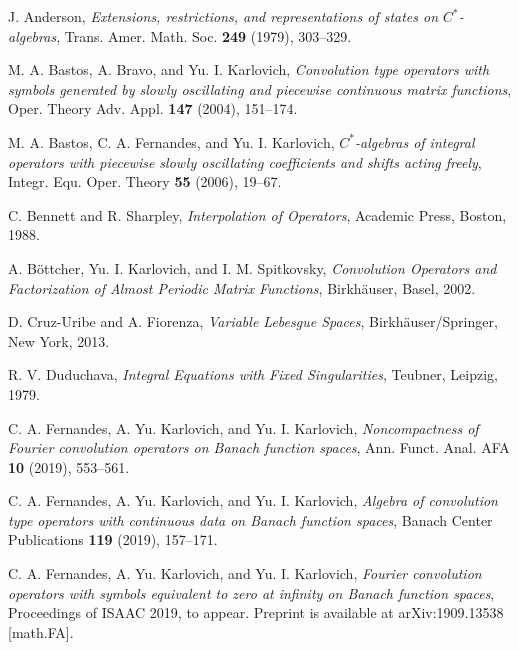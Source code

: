 \documentclass{birkjour}
\numberwithin{equation}{section}
\begin{document}
\begin{thebibliography}{XX}
J. Anderson,
\textit{Extensions, restrictions, and representations of states on
$C^*$-algebras},
Trans. Amer. Math. Soc. \textbf{249} (1979), 303--329.

M. A. Bastos, A. Bravo, and Yu. I. Karlovich,
\textit{Convolution type operators with symbols generated by slowly
oscillating and piecewise continuous matrix functions},
Oper. Theory Adv. Appl. \textbf{147} (2004), 151--174.

M. A. Bastos, C. A. Fernandes, and Yu. I. Karlovich,
\textit{$C^*$-algebras of integral operators with piecewise slowly
oscillating coefficients and shifts acting freely},
Integr. Equ. Oper. Theory \textbf{55} (2006), 19--67.

C. Bennett and R. Sharpley,
\textit{Interpolation of Operators},
Academic Press, Boston, 1988.

A. B\"ottcher, Yu. I. Karlovich, and I. M. Spitkovsky,
\textit{Convolution Operators and Factorization of Almost Periodic Matrix Functions},
Birkh\"auser, Basel, 2002.

D. Cruz-Uribe and A. Fiorenza,
\textit{Variable Lebesgue Spaces},
Birkh\"auser/Sprin\-ger, New York, 2013.


R. V. Duduchava,
\textit{Integral Equations with Fixed Singularities},
Teubner, Leipzig, 1979.

C. A. Fernandes, A. Yu. Karlovich, and Yu. I. Karlovich,
\textit{Noncompactness of Fourier convolution operators on Banach function
spaces},
Ann. Funct. Anal. AFA
{\textbf{10} (2019), 553--561.}

C. A. Fernandes, A. Yu. Karlovich, and Yu. I. Karlovich,
\textit{Algebra of convolution type operators with continuous data on Banach
function spaces},
{Banach Center Publications \textbf{119} (2019), 157--171.}

C. A. Fernandes, A. Yu. Karlovich, and Yu. I. Karlovich,
\textit{Fourier convolution operators with symbols equivalent to zero
at infinity on Banach function spaces},
{Proceedings of ISAAC 2019, to appear.}
Preprint is available at arXiv:1909.13538 [math.FA].


\end{thebibliography}
\end{document}
